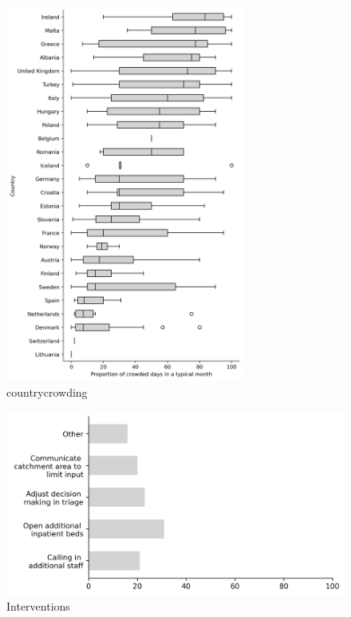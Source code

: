 \documentclass{article}
\begin{document}
\begin{figure}[H]
    \centering
        \includegraphics[width=0.7\textwidth]{../output/plots/country_crowding}
        \caption{countrycrowding}
        \label{fig:country_crowding}
\end{figure}

\begin{figure}[H]
    \centering
        \includegraphics[width=1.0\textwidth]{../output/plots/interventions}
        \caption{Interventions}
        \label{fig:interventions}
\end{figure}
\end{document}
